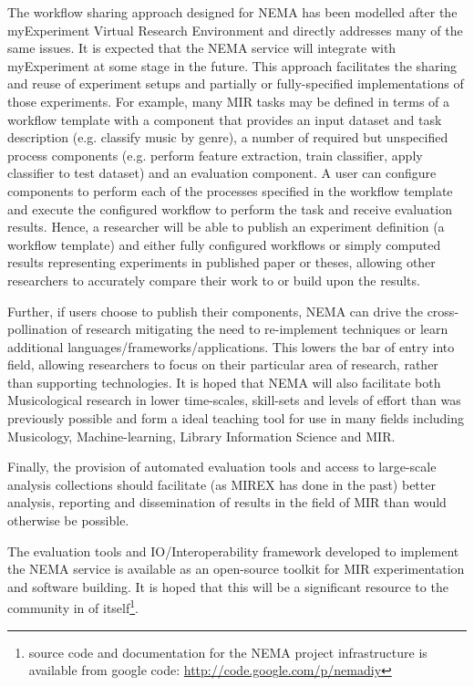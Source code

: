 \documentclass[conference]{IEEEtran}
\begin{document}
The workflow sharing approach designed for NEMA has been modelled after the myExperiment Virtual Research Environment \cite{de2007designing} and directly addresses many of the same issues. It is expected that the NEMA service will integrate with myExperiment at some stage in the future.  This approach facilitates the sharing and reuse of experiment setups and partially or fully-specified implementations of those experiments. For example, many MIR tasks may be defined in terms of a workflow template with a component that provides an input dataset and task description (e.g. classify music by genre), a number of required but unspecified process components (e.g. perform feature extraction, train classifier, apply classifier to test dataset) and an evaluation component. A user can configure components to perform each of the processes specified in the workflow template and execute the configured workflow to perform the task and receive evaluation results.  Hence, a researcher will be able to publish an experiment definition (a workflow template) and either fully configured workflows or simply computed results representing experiments in published paper or theses, allowing other researchers to accurately compare their work to or build upon the results.

Further, if users choose to publish their components, NEMA can drive the cross-pollination of research mitigating the need to re-implement techniques or learn additional languages/frameworks/applications. This lowers the bar of entry into field, allowing researchers to focus on their particular area of research, rather than supporting technologies. It is hoped that NEMA will also facilitate both Musicological research in lower time-scales, skill-sets and levels of effort than was previously possible and form a ideal teaching tool for use in many fields including Musicology, Machine-learning, Library Information Science and MIR.  

Finally, the provision of automated evaluation tools and access to large-scale analysis collections should facilitate (as MIREX has done in the past) better analysis, reporting and dissemination of results in the field of MIR than would otherwise be possible.

The evaluation tools and IO/Interoperability framework developed to implement the NEMA service is available as an open-source toolkit for MIR experimentation and software building. It is hoped that this will be a significant resource to the community in of itself\footnote{source code and documentation for the NEMA project infrastructure is available from google code: \url{http://code.google.com/p/nemadiy}}. 
\end{document}
